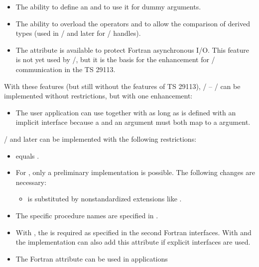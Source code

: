 \begin{itemize}
\begin{itemize}
   \item The ability to define an 
         and to use it for  dummy arguments.
   \item The ability to overload the operators  and
          to allow the comparison of derived types (used in
         \MPIIIIDOTO/ and later for \MPI/ handles).
   \item The  attribute is available to protect
         Fortran asynchronous I/O.
         This feature is not yet used by \MPI/, but it is the basis
         for the enhancement for \MPI/ communication in the
         TS 29113.
   \end{itemize}
  With these features (but still without the features of TS 29113),
  \MPIIDOTI/ -- \MPIIIDOTII/ can be implemented
  without restrictions, but with one enhancement:
   \begin{itemize}
   \item The user application can use  together with
          as long as 
         is defined with an implicit interface because a
          and an 
         argument must both map to a  argument.
   \end{itemize}
  \MPIIIIDOTO/ and later can be implemented with the following restrictions:
   \begin{itemize}
   \item
        equals .
   \item
       For , only a preliminary implementation is possible.
       The following changes are necessary:
       \begin{itemize}
        \item {} is substituted by
              nonstandardized extensions like .
       \end{itemize}
   \item
       The specific procedure names are specified in .
   \item
       With , the  is required as specified in
       the second Fortran interfaces.
       With  and  the implementation can also add
       this attribute if explicit interfaces are used.
   \item
       The  Fortran attribute can be used in applications

\end{itemize}
\end{itemize}
